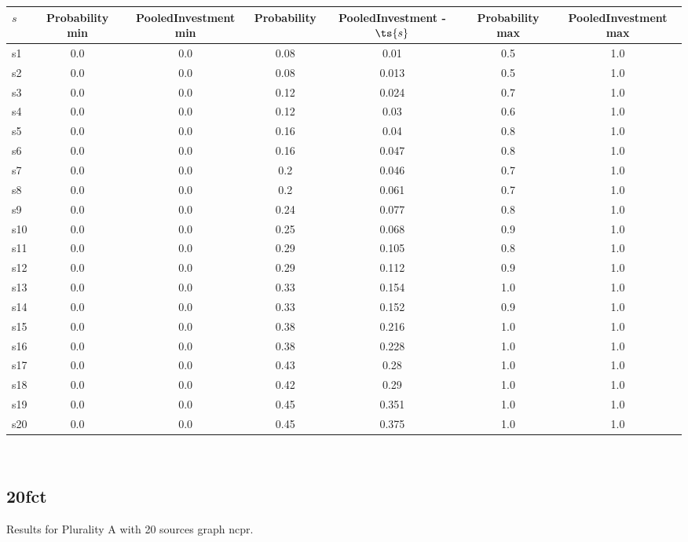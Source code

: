 \documentclass{article}
\begin{document}
\noindent\begin{tabular}{|l|c|c|c|c|c|c|}
\hline
$s$& Probability min & PooledInvestment min & Probability & PooledInvestment - $\ts{s}$ & Probability max & PooledInvestment max\\
\hline
s1 &0.0 & 0.0 & 0.08 & 0.01 & 0.5 & 1.0\\
\hline
s2 &0.0 & 0.0 & 0.08 & 0.013 & 0.5 & 1.0\\
\hline
s3 &0.0 & 0.0 & 0.12 & 0.024 & 0.7 & 1.0\\
\hline
s4 &0.0 & 0.0 & 0.12 & 0.03 & 0.6 & 1.0\\
\hline
s5 &0.0 & 0.0 & 0.16 & 0.04 & 0.8 & 1.0\\
\hline
s6 &0.0 & 0.0 & 0.16 & 0.047 & 0.8 & 1.0\\
\hline
s7 &0.0 & 0.0 & 0.2 & 0.046 & 0.7 & 1.0\\
\hline
s8 &0.0 & 0.0 & 0.2 & 0.061 & 0.7 & 1.0\\
\hline
s9 &0.0 & 0.0 & 0.24 & 0.077 & 0.8 & 1.0\\
\hline
s10 &0.0 & 0.0 & 0.25 & 0.068 & 0.9 & 1.0\\
\hline
s11 &0.0 & 0.0 & 0.29 & 0.105 & 0.8 & 1.0\\
\hline
s12 &0.0 & 0.0 & 0.29 & 0.112 & 0.9 & 1.0\\
\hline
s13 &0.0 & 0.0 & 0.33 & 0.154 & 1.0 & 1.0\\
\hline
s14 &0.0 & 0.0 & 0.33 & 0.152 & 0.9 & 1.0\\
\hline
s15 &0.0 & 0.0 & 0.38 & 0.216 & 1.0 & 1.0\\
\hline
s16 &0.0 & 0.0 & 0.38 & 0.228 & 1.0 & 1.0\\
\hline
s17 &0.0 & 0.0 & 0.43 & 0.28 & 1.0 & 1.0\\
\hline
s18 &0.0 & 0.0 & 0.42 & 0.29 & 1.0 & 1.0\\
\hline
s19 &0.0 & 0.0 & 0.45 & 0.351 & 1.0 & 1.0\\
\hline
s20 &0.0 & 0.0 & 0.45 & 0.375 & 1.0 & 1.0\\
\hline
\end{tabular}\\

\newpage

\subsection{20fct}

\noindent Results for Plurality A with 20 sources graph ncpr.
\end{document}
